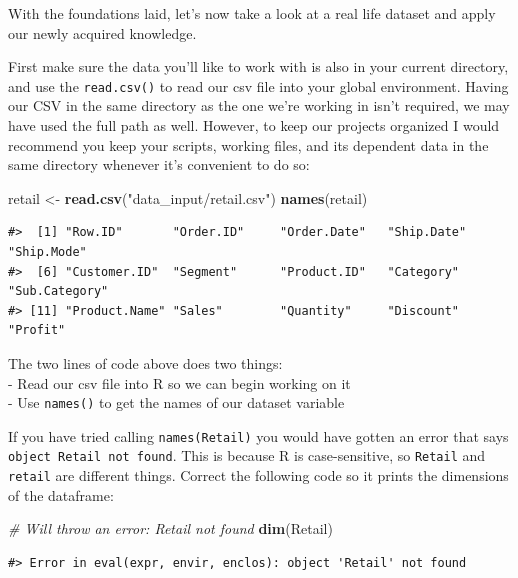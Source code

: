 \documentclass[]{article}
\newenvironment{Shaded}{\begin{snugshade}}{\end{snugshade}}
\newcommand{\CommentTok}[1]{\textcolor[rgb]{0.56,0.35,0.01}{\textit{#1}}}
\newcommand{\KeywordTok}[1]{\textcolor[rgb]{0.13,0.29,0.53}{\textbf{#1}}}
\newcommand{\NormalTok}[1]{#1}
\newcommand{\StringTok}[1]{\textcolor[rgb]{0.31,0.60,0.02}{#1}}
\begin{document}
With the foundations laid, let's now take a look at a real life dataset
and apply our newly acquired knowledge.

First make sure the data you'll like to work with is also in your
current directory, and use the \texttt{read.csv()} to read our csv file
into your global environment. Having our CSV in the same directory as
the one we're working in isn't required, we may have used the full path
as well. However, to keep our projects organized I would recommend you
keep your scripts, working files, and its dependent data in the same
directory whenever it's convenient to do so:

\begin{Shaded}
\begin{Highlighting}[]
\NormalTok{retail <-}\StringTok{ }\KeywordTok{read.csv}\NormalTok{(}\StringTok{"data_input/retail.csv"}\NormalTok{)}
\KeywordTok{names}\NormalTok{(retail)}
\end{Highlighting}
\end{Shaded}

\begin{verbatim}
#>  [1] "Row.ID"       "Order.ID"     "Order.Date"   "Ship.Date"    "Ship.Mode"   
#>  [6] "Customer.ID"  "Segment"      "Product.ID"   "Category"     "Sub.Category"
#> [11] "Product.Name" "Sales"        "Quantity"     "Discount"     "Profit"
\end{verbatim}

The two lines of code above does two things:\\
- Read our csv file into R so we can begin working on it\\
- Use \texttt{names()} to get the names of our dataset variable

If you have tried calling \texttt{names(Retail)} you would have gotten
an error that says
\texttt{object\ \textquotesingle{}Retail\textquotesingle{}\ not\ found}.
This is because R is case-sensitive, so \texttt{Retail} and
\texttt{retail} are different things. Correct the following code so it
prints the dimensions of the dataframe:

\begin{Shaded}
\begin{Highlighting}[]
\CommentTok{# Will throw an error: Retail not found}
\KeywordTok{dim}\NormalTok{(Retail)}
\end{Highlighting}
\end{Shaded}

\begin{verbatim}
#> Error in eval(expr, envir, enclos): object 'Retail' not found
\end{verbatim}
\end{document}
